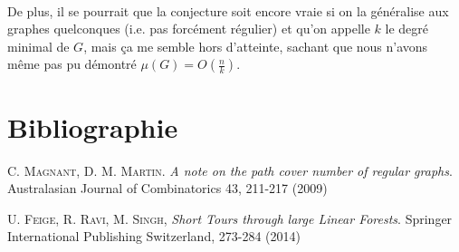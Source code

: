 \documentclass[a4paper]{article}
\theoremstyle{definition}
\theoremstyle{remark}
\begin{document}
\paragraph{}
De plus, il se pourrait que la conjecture soit encore vraie si on la 
généralise aux graphes quelconques (i.e. pas forcément régulier) et 
qu'on appelle $k$ le degré minimal de $G$, mais ça me semble hors 
d'atteinte, sachant que nous n'avons même pas pu démontré $\mu(G)=O(\frac{n}{k})$.

\part{Bibliographie}
\begin{thebibliography}{}
     C. \textsc {Magnant}, D. M. \textsc{Martin}. \emph{A note on the path cover number of regular graphs}. Australasian Journal of Combinatorics 43, 211-217 (2009)

 U. \textsc {Feige}, R. \textsc{Ravi}, M. \textsc{Singh}, \emph{Short Tours through large Linear Forests}. Springer International Publishing Switzerland, 273-284 (2014) 
\end{thebibliography}
\end{document}
